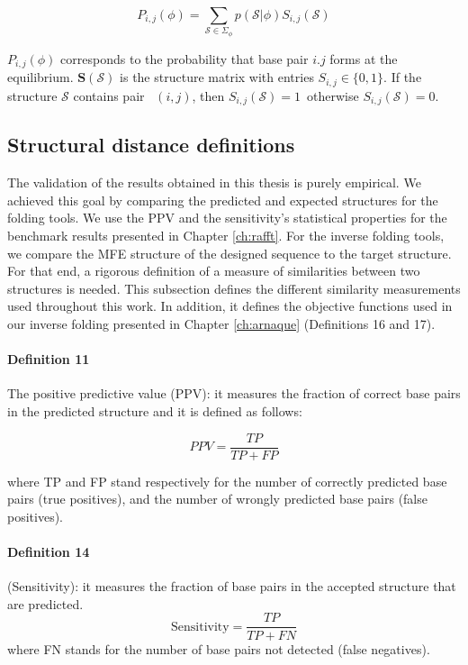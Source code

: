 \begin{equation}
	P_{i,j}(\phi) = \sum_{\mathcal{S} \in \Sigma_{\phi}}{p(\mathcal{S}|\phi)S_{i,j}(\mathcal{S})}
\end{equation} 

$P_{i,j}(\phi)$ corresponds to the probability that base pair $i.j$ forms at the equilibrium. 
\(\mathbf{S}(\mathcal{S})\) is the structure matrix with entries \(S_{i,j} \in  \{ 0, 1\}\). If the structure \(\mathcal{S}\) contains pair~ $(i ,j)$, then \(S_{i,j}(\mathcal{S}) = 1\)~otherwise \(S_{i,j}(\mathcal{S}) = 0\).

\subsection{Structural distance definitions }
The validation of the results obtained in this thesis is purely empirical. We achieved this goal by comparing the predicted and expected structures for the folding tools. We use the PPV and the sensitivity's statistical properties for the benchmark results presented in Chapter \ref{ch:rafft}. For the inverse folding tools, we compare the MFE structure of the designed sequence to the target structure. For that end, a rigorous definition of a measure of similarities between two structures is needed. This subsection defines the different similarity measurements used throughout this work. In addition, it defines the objective functions used in our inverse folding presented in Chapter \ref{ch:arnaque} (Definitions 16 and 17). 
\paragraph{\textbf{Definition 11}}  The positive predictive value (PPV):  it measures the fraction of correct base pairs in the predicted structure and it is defined as follows: 

\begin{equation}
	PPV = \frac{TP}{TP + FP}
\end{equation}

where TP and FP stand respectively for the number of correctly predicted base pairs (true positives), and the number of wrongly predicted base pairs (false positives). 

\paragraph{\textbf{Definition 14}} (Sensitivity): it measures the fraction of
base pairs in the accepted structure that are predicted.
\begin{equation}
\text{Sensitivity} = \frac{TP}{TP+FN}
\end{equation}
where FN stands for the number of base pairs not detected (false
negatives).

